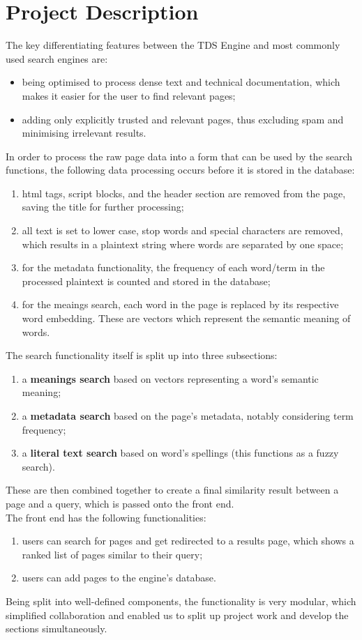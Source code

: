 \section{Project Description}

The key differentiating features between the TDS Engine and most commonly used search engines are:

\begin{itemize}
  \item being optimised to process dense text and technical documentation, which makes it easier for the user to find relevant pages;
  \item adding only explicitly trusted and relevant pages, thus excluding spam and minimising irrelevant results.
\end{itemize}

In order to process the raw page data into a form that can be used by the search functions, the following data processing occurs before it is stored in the database:
\begin{enumerate}
  \item html tags, script blocks, and the header section are removed from the page, saving the title for further processing;
  \item all text is set to lower case, stop words and special characters are removed, which results in a plaintext string where words are separated by one space;
  \item for the metadata functionality, the frequency of each word/term in the processed plaintext is counted and stored in the database;
  \item for the meaings search, each word in the page is replaced by its respective word embedding. These are vectors which represent the semantic meaning of words. 
\end{enumerate}

The search functionality itself is split up into three subsections:
\begin{enumerate}
  \item a \textbf{meanings search} based on vectors representing a word's semantic meaning;
  \item a \textbf{metadata search} based on the page's metadata, notably considering term frequency;
  \item a \textbf{literal text search} based on word's spellings (this functions as a fuzzy search).
\end{enumerate}
These are then combined together to create a final similarity result between a page and a query, which is passed onto the front end. \\

The front end has the following functionalities:
\begin{enumerate}
  \item users can search for pages and get redirected to a results page, which shows a ranked list of pages similar to their query;
  \item users can add pages to the engine's database.
\end{enumerate}

Being split into well-defined components, the functionality is very modular, which simplified collaboration and enabled us to split up project work and develop the sections simultaneously.
